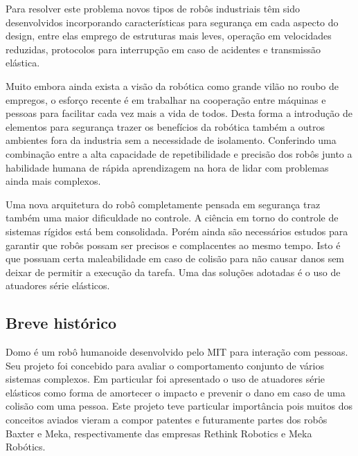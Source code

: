 Para resolver este problema novos tipos de robôs industriais têm sido desenvolvidos incorporando características para segurança em cada aspecto do design, entre elas emprego de estruturas mais leves, operação em velocidades reduzidas, protocolos para interrupção em caso de acidentes e transmissão elástica. \cite{nobody}

Muito embora ainda exista a visão da robótica como grande vilão no roubo de empregos, o esforço recente é em trabalhar na cooperação entre máquinas e pessoas para facilitar cada vez mais a vida de todos. \cite{nobody} Desta forma a introdução de elementos para segurança trazer os benefícios da robótica também a outros ambientes fora da industria sem a necessidade de isolamento. Conferindo uma combinação entre a alta capacidade de repetibilidade e precisão dos robôs junto a habilidade humana de rápida aprendizagem na hora de lidar com problemas ainda mais complexos.

Uma nova arquitetura do robô completamente pensada em segurança traz também uma maior dificuldade no controle. A ciência em torno do controle de sistemas rígidos está bem consolidada. Porém ainda são necessários estudos para garantir que robôs possam ser precisos e complacentes ao mesmo tempo. Isto é que possuam certa maleabilidade em caso de colisão para não causar danos sem deixar de permitir a execução da tarefa. Uma das soluções adotadas é o uso de atuadores série elásticos.



\subsection{Breve histórico}


Domo é um robô humanoide desenvolvido pelo MIT para interação com pessoas. Seu projeto foi concebido para avaliar o comportamento conjunto de vários sistemas complexos. Em particular foi apresentado o uso de atuadores série elásticos como forma de amortecer o impacto e prevenir o dano em caso de uma colisão com uma pessoa. Este projeto teve particular importância pois muitos dos conceitos aviados vieram a compor patentes e futuramente partes dos robôs Baxter e Meka, respectivamente das empresas Rethink Robotics e Meka Robótics. 

